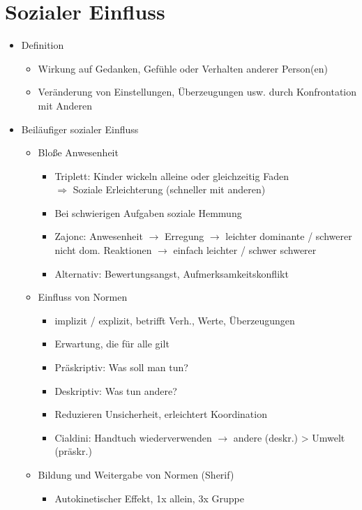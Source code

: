 \documentclass[11pt, paper=a4, twocolumn]{scrartcl}
\begin{document}
	\section{Sozialer Einfluss}
		\begin{itemize}
			\item Definition
				\begin{itemize}
					\item Wirkung auf Gedanken, Gefühle oder Verhalten anderer Person(en)
					\item Veränderung von Einstellungen, Überzeugungen usw. durch Konfrontation mit Anderen
				\end{itemize}
			\item Beiläufiger sozialer Einfluss
				\begin{itemize}
					\item Bloße Anwesenheit
						\begin{itemize}
							\item Triplett: Kinder wickeln alleine oder gleichzeitig Faden\\
								$\Rightarrow$ Soziale Erleichterung (schneller mit anderen)
							\item Bei schwierigen Aufgaben soziale Hemmung
							\item Zajonc: Anwesenheit $\rightarrow$ Erregung $\rightarrow$ leichter dominante / 
								schwerer nicht dom. Reaktionen $\rightarrow$ einfach leichter / schwer schwerer
							\item Alternativ: Bewertungsangst, Aufmerksamkeitskonflikt
						\end{itemize}
					\item Einfluss von Normen
						\begin{itemize}
							\item implizit / explizit, betrifft Verh., Werte, Überzeugungen
							\item Erwartung, die für alle gilt
							\item Präskriptiv: Was soll man tun?
							\item Deskriptiv: Was tun andere?
							\item Reduzieren Unsicherheit, erleichtert Koordination
							\item Cialdini: Handtuch wiederverwenden $\rightarrow$ andere (deskr.) > Umwelt (präskr.)
						\end{itemize}
					\item Bildung und Weitergabe von Normen (Sherif)
						\begin{itemize}
							\item Autokinetischer Effekt, 1x allein, 3x Gruppe

\end{itemize}
\end{itemize}
\end{itemize}
\end{document}
